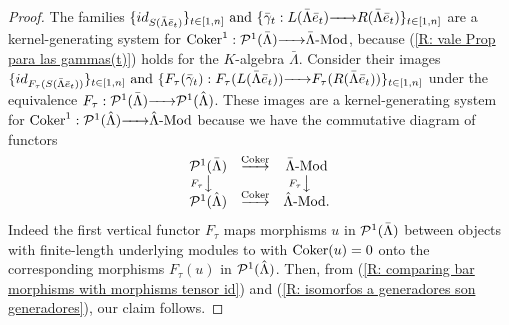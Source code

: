 \documentclass{article}
\theoremstyle{definition}
\newcommand{\Coker}{{ \rm Coker }}
\newcommand{\Mod}{{ \rm Mod }}
\newcommand{\g}{\hbox{-}}
\newcommand{\rightmap}[1]{\smash{\mathop{\hbox to 
20pt{\rightarrowfill}}\limits^{#1}}}
\newcommand{\shortlmapdown}[1]
{\llap{$\vcenter{\hbox{$\scriptstyle#1$}}$}\big\downarrow}
\begin{document}
\begin{proof} The families 
$
\{id_{S(\bar{\Lambda}\bar{e}_t)}\}_{t\in [1,n]}
\hbox{ and } 
\{\bar{\gamma}_t:L(\bar{\Lambda} \bar{e}_t)\rightmap{}R(\bar{\Lambda} \bar{e}_t)\}_{t\in [1,n]}$ are a kernel-generating system for $\Coker^1:{\cal P}^1(\bar{\Lambda})\rightmap{}\bar{\Lambda}\g\Mod$, because (\ref{R: vale Prop para las gammas(t)}) holds for the $K$-algebra $\bar{\Lambda}$. Consider their images $
\{id_{F_\tau(S(\bar{\Lambda}\bar{e}_t))}\}_{t\in [1,n]}
\hbox{ and } 
\{F_\tau(\bar{\gamma}_t):F_\tau(L(\bar{\Lambda} \bar{e}_t))\rightmap{}F_\tau(R(\bar{\Lambda} \bar{e}_t))\}_{t\in [1,n]}$ under the equivalence 
 $F_\tau:{\cal P}^1(\bar{\Lambda})\rightmap{}{\cal P}^1(\hat{\Lambda})$. These images are a kernel-generating system for $\Coker^1:{\cal P}^1(\hat{\Lambda})\rightmap{}\hat{\Lambda}\g\Mod$ because  we have the commutative diagram of functors 
 $$\begin{matrix}{\cal P}^1(\bar{\Lambda})&\rightmap{\Coker}&\bar{\Lambda}\g\Mod\\
 \shortlmapdown{F_\tau}&&\shortlmapdown{F_\tau}\\
 {\cal P}^1(\hat{\Lambda})&\rightmap{\Coker}&\hat{\Lambda}\g\Mod.\\
 \end{matrix}$$
Indeed the first vertical functor $F_\tau$  maps morphisms $u$ in ${\cal P}^1(\bar{\Lambda})$ between objects with finite-length underlying modules to with $\Coker(u)=0$ onto the corresponding morphisms $F_\tau(u)$ in ${\cal P}^1(\hat{\Lambda})$.  
 Then, from (\ref{R: comparing bar morphisms with morphisms tensor id}) and (\ref{R: isomorfos a generadores son generadores}), our claim follows. 
\end{proof}
\end{document}
